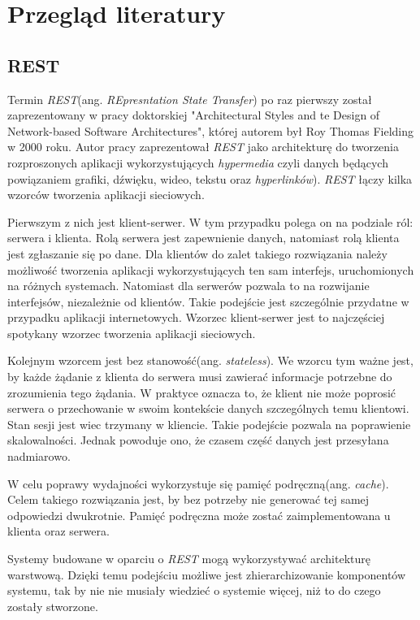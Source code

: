\chapter{Przegląd literatury}

\section{REST}
Termin \textsl{REST}(ang. \textsl{REpresntation State Transfer}) po raz pierwszy został zaprezentowany w pracy doktorskiej "Architectural Styles and te Design of Network-based Software Architectures", której autorem był Roy Thomas Fielding w 2000 roku. Autor pracy zaprezentował \textsl{REST} jako architekturę do tworzenia rozproszonych aplikacji wykorzystujących \textsl{hypermedia} czyli danych będących powiązaniem grafiki, dźwięku, wideo, tekstu oraz \textsl{hyperlinków}). \textsl{REST} łączy kilka wzorców tworzenia aplikacji sieciowych. 

Pierwszym z nich jest klient-serwer. W tym przypadku polega on na podziale ról: serwera i klienta. Rolą serwera jest zapewnienie danych, natomiast rolą klienta jest zgłaszanie się po dane. Dla klientów do zalet takiego rozwiązania należy możliwość tworzenia aplikacji wykorzystujących ten sam interfejs, uruchomionych na różnych systemach. Natomiast dla serwerów pozwala to na rozwijanie interfejsów, niezależnie od klientów. Takie podejście jest szczególnie przydatne w przypadku aplikacji internetowych. Wzorzec klient-serwer jest to najczęściej spotykany wzorzec tworzenia aplikacji sieciowych.

Kolejnym wzorcem jest bez stanowość(ang. \textsl{stateless}). We wzorcu tym ważne jest, by każde żądanie z klienta do serwera musi zawierać informacje potrzebne do zrozumienia tego żądania. W praktyce oznacza to, że klient nie może poprosić serwera o przechowanie w swoim kontekście danych szczególnych temu klientowi. Stan sesji jest wiec trzymany w kliencie. Takie podejście pozwala na poprawienie skalowalności. Jednak powoduje ono, że czasem część danych jest przesyłana nadmiarowo.

W celu poprawy wydajności wykorzystuje się pamięć podręczną(ang. \textsl{cache}). Celem takiego rozwiązania jest, by bez potrzeby nie generować tej samej odpowiedzi dwukrotnie. Pamięć podręczna może zostać zaimplementowana u klienta oraz serwera.

Systemy budowane w oparciu o \textsl{REST} mogą wykorzystywać architekturę warstwową. Dzięki temu podejściu możliwe jest zhierarchizowanie komponentów systemu, tak by nie nie musiały wiedzieć o systemie więcej, niż to do czego zostały stworzone. 

